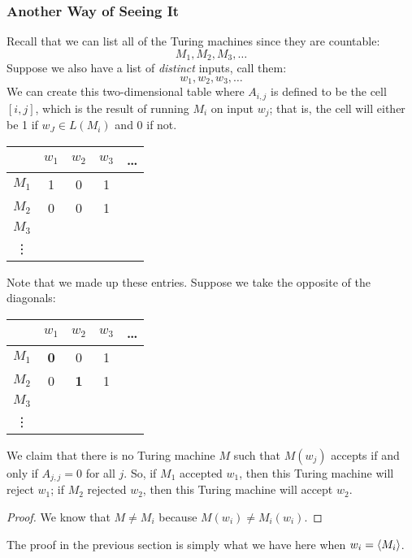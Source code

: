 \documentclass[letterpaper]{article}
\begin{document}
\subsubsection{Another Way of Seeing It}
Recall that we can list all of the Turing machines since they are countable: 
\[M_1, M_2, M_3, \dots\]
Suppose we also have a list of \emph{distinct} inputs, call them: 
\[w_1, w_2, w_3, \dots\]
We can create this two-dimensional table where $A_{i, j}$ is defined to be the cell $[i, j]$, which is the result of running $M_i$ on input $w_j$; that is, the cell will either be 1 if $w_J \in L(M_i)$ and 0 if not.  
\begin{center}
    \begin{tabular}{c|c|c|c|c}
                & $w_1$ & $w_2$ & $w_3$ & \dots \\
        \hline 
        $M_1$   &   1   &   0   &   1   & \\
        \hline 
        $M_2$   &   0   &   0   &   1   & \\
        \hline 
        $M_3$   &       &       &       & \\
        \hline 
        \vdots  &       &       &       &
    \end{tabular}
\end{center}
Note that we made up these entries. Suppose we take the opposite of the diagonals: 
\begin{center}
    \begin{tabular}{c|c|c|c|c}
                & $w_1$ & $w_2$ & $w_3$ & \dots \\
        \hline 
        $M_1$   & \textbf{0} &   0   &   1   & \\
        \hline 
        $M_2$   &   0   & \textbf{1} &   1   & \\
        \hline 
        $M_3$   &       &       &       & \\
        \hline 
        \vdots  &       &       &       &
    \end{tabular}
\end{center}

We claim that there is no Turing machine $M$ such that $M(w_j)$ accepts if and only if $A_{j, j} = 0$ for all $j$. So, if $M_1$ accepted $w_1$, then this Turing machine will reject $w_1$; if $M_2$ rejected $w_2$, then this Turing machine will accept $w_2$. 

\begin{mdframed}[]
    \begin{proof}
        We know that $M \neq M_i$ because $M(w_i) \neq M_{i}(w_i)$.
    \end{proof}
\end{mdframed}
The proof in the previous section is simply what we have here when $w_i = \langle M_i \rangle$. 
\end{document}
